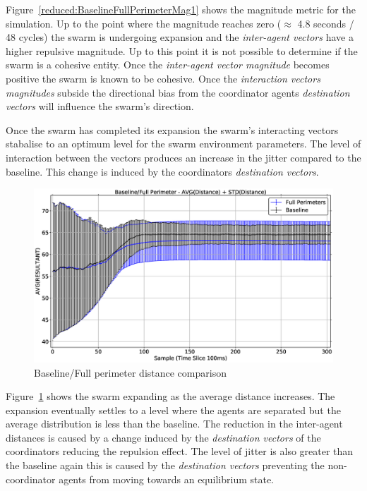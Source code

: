 Figure~\ref{reduced:BaselineFullPerimeterMag1} shows the magnitude metric for the simulation. Up to the point where the magnitude reaches zero ($\approx$ 4.8 seconds / 48 cycles) the swarm is undergoing expansion and the \textit{inter-agent vectors} have a higher repulsive magnitude. Up to this point it is not possible to determine if the swarm is a cohesive entity. Once the \textit{inter-agent vector magnitude} becomes positive the swarm is known to be cohesive. Once the \textit{interaction vectors magnitudes} subside the directional bias from the coordinator agents \textit{destination vectors} will influence the swarm's direction. 

Once the swarm has completed its expansion the swarm's interacting vectors stabalise to an optimum level for the swarm environment parameters. The level of interaction between the vectors produces an increase in the jitter compared to the baseline. This change is induced by the coordinators \textit{destination vectors}.

\begin{figure}[H]
\begin{center}
\includegraphics[width=14cm]{CHAPTER-6/figures/BaselineFullPerimeterDist1}
\end{center}
\caption{Baseline/Full perimeter distance comparison\label{reduced:BaselineFullPerimeterDist1}}
\end{figure}

Figure~\ref{reduced:BaselineFullPerimeterDist1} shows the swarm expanding as the average distance increases. The expansion eventually settles to a level where the agents are separated but the average distribution is less than the baseline. The reduction in the inter-agent distances is caused by a change induced by the \textit{destination vectors} of the coordinators reducing the repulsion effect. The level of jitter is also greater than the baseline again this is caused by the \textit{destination vectors} preventing the non-coordinator agents from moving towards an equilibrium state.

